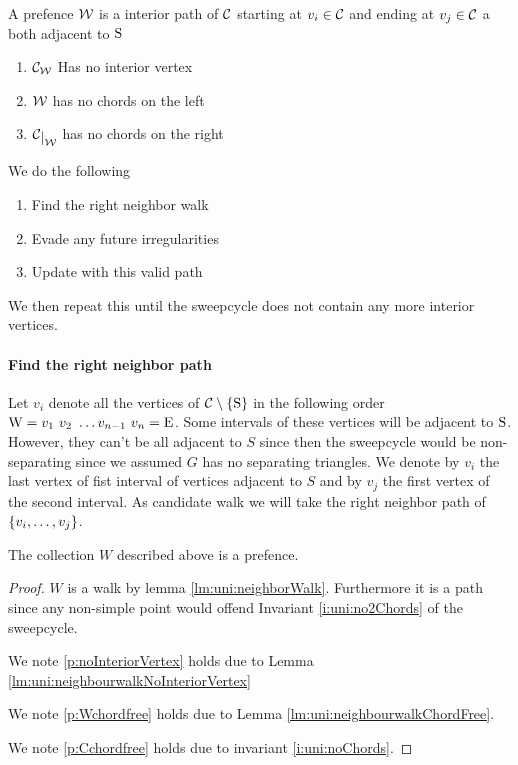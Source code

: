   \begin{defi}[Prefence]
  A prefence $\mathcal{W}$ is a interior path of $\mathcal{C}$ starting at $v_i \in \mathcal{C}$ and ending at $v_j \in \mathcal{C}$ a both adjacent to $\mathrm{S}$
  \begin{enumerate}
    \itemsep=-4pt
    \renewcommand*{\labelenumi}{(P\arabic{enumi})}%
    \renewcommand*{\theenumi}{(P\arabic{enumi})}%

    \item  $\mathcal{C}_{\mathcal{W}}$ Has no interior vertex
    \label{p:noInteriorVertex}
    \item  $\mathcal{W}$ has no chords on the left     \label{p:Wchordfree}
    \item  $\restC{\W}$ has no chords on the right     \label{p:Cchordfree}
  \end{enumerate}
  \end{defi}

  We do the following
  \begin{enumerate}
    \itemsep=-4pt
    \item Find the right neighbor walk
    \item Evade any future irregularities
    \item Update with this valid path
  \end{enumerate}

  We then repeat this until the sweepcycle does not contain any more interior vertices.

  \paragraph{Find the right neighbor path}
    Let $v_i$ denote all the vertices of $\mathcal{C} \setminus \left\lbrace {\mathrm{S}} \right\rbrace$ in the following order $\mathrm{W} =  v_1 \  v_2 \  \ldots v_{n-1} \  v_n = \mathrm{E}$.
    Some intervals of these vertices will be adjacent to $\mathrm{S}$. However, they can't be all adjacent to $S$ since then the sweepcycle would be non-separating since we assumed $G$ has no separating triangles. We denote by $v_i$ the last vertex of fist interval of vertices adjacent to $S$ and by $v_j$ the first vertex of the second interval.
    As candidate walk we will take the right neighbor path of $\left\lbrace {v_i, \ldots, v_j} \right\rbrace$.

    \begin{lemma}
      \label{lm:uni:isPrefence}
    The collection $W$ described above is a prefence.
    \end{lemma}
    \begin{proof}
    $W$ is a walk by lemma \ref{lm:uni:neighborWalk}. Furthermore it is a path since any non-simple point would offend Invariant \ref{i:uni:no2Chords} of the sweepcycle.


    We note \ref{p:noInteriorVertex} holds due to Lemma \ref{lm:uni:neighbourwalkNoInteriorVertex}

    We note \ref{p:Wchordfree} holds due to Lemma \ref{lm:uni:neighbourwalkChordFree}.

    We note \ref{p:Cchordfree} holds due to invariant \ref{i:uni:noChords}.
    \end{proof}

